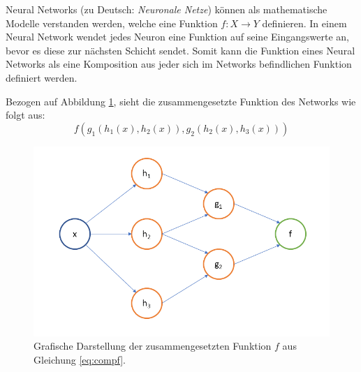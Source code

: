 Neural Networks (zu Deutsch: \textit{Neuronale Netze}) können als mathematische Modelle verstanden werden, welche eine Funktion $f : X \rightarrow Y$ definieren. In einem Neural Network wendet jedes Neuron eine Funktion auf seine Eingangswerte an, bevor es diese zur nächsten Schicht sendet. Somit kann die Funktion eines Neural Networks als eine Komposition aus jeder sich im Networks befindlichen Funktion definiert werden. 

Bezogen auf Abbildung \ref{fig:composedGraph}, sieht die zusammengesetzte Funktion des Networks wie folgt aus: 
\begin{equation}
\label{eq:compf}
f(g_1(h_1(x), h_2(x)),g_2(h_2(x), h_3(x)))
\end{equation}

\begin{figure}[ht]
\centering
\includegraphics[scale=0.4]{pictures/grafiken/Folie4}
\caption[Caption for LOF]{Grafische Darstellung der zusammengesetzten Funktion $f$ aus Gleichung \ref{eq:compf}.}
\label{fig:composedGraph}

\end{figure}

